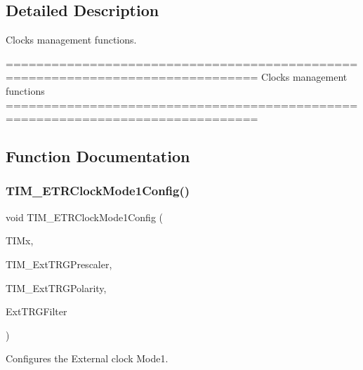 \subsection{Detailed Description}
Clocks management functions. 

\begin{DoxyVerb} ===============================================================================
                         Clocks management functions
 ===============================================================================  \end{DoxyVerb}
 

\subsection{Function Documentation}
\mbox{\label{group___t_i_m___group6_ga47c05638b93aabcd641dbc8859e1b2df}} 
\subsubsection{\texorpdfstring{T\+I\+M\+\_\+\+E\+T\+R\+Clock\+Mode1\+Config()}{TIM\_ETRClockMode1Config()}}
{\footnotesize\ttfamily void T\+I\+M\+\_\+\+E\+T\+R\+Clock\+Mode1\+Config (\begin{DoxyParamCaption}\item[{\hyperlink{struct_t_i_m___type_def}{T\+I\+M\+\_\+\+Type\+Def} $\ast$}]{T\+I\+Mx,  }\item[{uint16\+\_\+t}]{T\+I\+M\+\_\+\+Ext\+T\+R\+G\+Prescaler,  }\item[{uint16\+\_\+t}]{T\+I\+M\+\_\+\+Ext\+T\+R\+G\+Polarity,  }\item[{uint16\+\_\+t}]{Ext\+T\+R\+G\+Filter }\end{DoxyParamCaption})}



Configures the External clock Mode1. 


